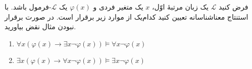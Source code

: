 فرض کنید $\mathcal{L}$ یک زبان مرتبهٔ اوّل، $x$ یک متغیر فردی و $\varphi(x)$ یک $\mathcal{L}$-فرمول باشد. با استنتاج معناشناسانه تعیین کنید کدام‌یک از موارد زیر برقرار است. در صورت برقرار نبودن مثال نقض بیاورید.
\begin{enumerate}[label=(\alph*)]
  \item $\forall x (\varphi(x) \to \exists x \neg \varphi(x)) \vDash \forall x \neg \varphi(x)$
  ~
  \item $\exists x (\varphi(x) \to \forall x \neg \varphi(x)) \vDash \exists x \neg \varphi(x)$
  ~
\end{enumerate}